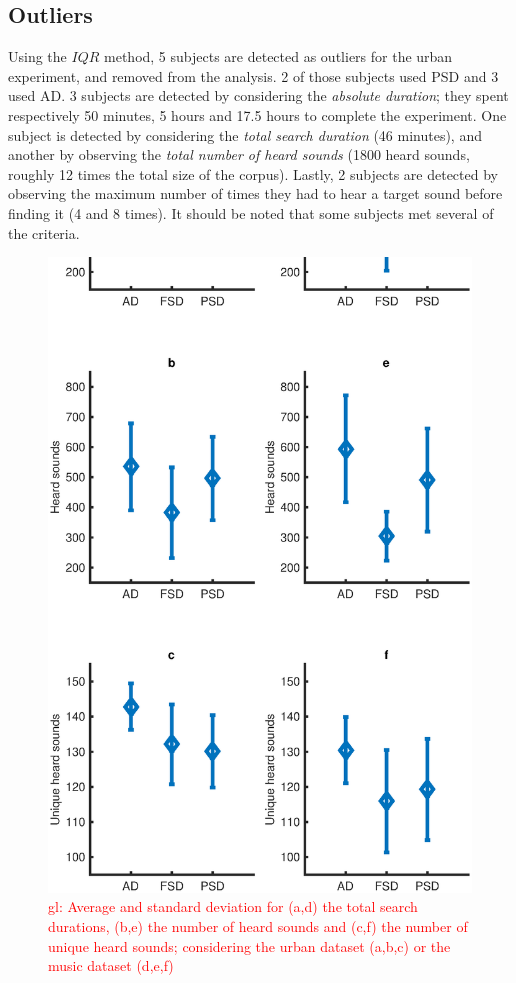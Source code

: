 \documentclass{aes2e}
\newcommand{\gl}[1]{\textcolor{red}{gl: #1}}
\begin{document}
\subsection{Outliers}

Using the $IQR$ method, 5 subjects are detected as outliers for the urban experiment, and removed from the analysis. 2 of those subjects used PSD and 3 used AD. 3 subjects are detected by considering the \textit{absolute duration}; they spent respectively 50 minutes, 5 hours and 17.5 hours to complete the experiment. One subject is detected by considering the \textit{total search duration} (46 minutes), and another by observing the \textit{total number of heard sounds} (1800 heard sounds, roughly 12 times the total size of the corpus). Lastly, 2 subjects are detected by observing the maximum number of times they had to hear a target sound before finding it (4 and 8 times). It should be noted that some subjects met several of the criteria.

\begin{figure}[t]
\begin{center}
\includegraphics[width=\columnwidth]{gfx/urbanMusic1.eps} 
\end{center}
\caption{\label{urbanMusic} \gl{Average and standard deviation for (a,d) the total search durations, (b,e) the number of heard sounds and (c,f) the number of unique heard sounds; considering the urban dataset (a,b,c) or the music dataset (d,e,f)}}
\end{figure}  
\end{document}
